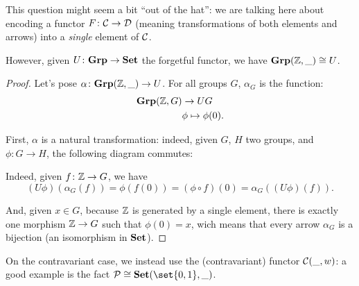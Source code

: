 \documentclass[a4paper]{article}
\theoremstyle { remark }
\theoremstyle { definition }
\theoremstyle { plain }
\begin{document}
This question might seem a bit \enquote{out of the hat}: we are talking here about encoding a functor \( F \colon  \mathcal { C }  \to  \mathcal { D }  \) (meaning transformations of both elements and arrows) into a \emph{single} element of \(  \mathcal { C }  \).

However, given \( U \colon  \mathbf { Grp }  \to  \mathbf { Set }  \) the forgetful functor, we have \(  \mathbf { Grp } ( \mathbb { Z } , \_) \cong U \).

\begin{proof}
Let's pose \( \alpha \colon  \mathbf { Grp } ( \mathbb { Z } , \_) \to U \).
For all groups \( G \), \( \alpha_G \) is the function:
\begin{align*}
   \mathbf { Grp } ( \mathbb { Z } , G) & \to U G \\
              & \phi \mapsto \phi(0).
\end{align*}

First, \( \alpha \) is a natural transformation: indeed, given \( G \), \( H \) two groups, and \( \phi \colon G \to H \), the following diagram commutes:

\begin{center}
\end{center}

Indeed, given \( f \colon  \mathbb { Z }  \to G \), we have
\[
  (U \phi) (\alpha_G(f))
  = \phi(f(0))
  = (\phi \circ f)(0)
  = \alpha_G((U\phi)(f)).
\]

And, given \( x \in G \), because \(  \mathbb { Z }  \) is generated by a single element, there is exactly one morphism \(  \mathbb { Z }  \to G \) such that \( \phi(0) = x \), wich means that every arrow \( \alpha_G \) is a bijection (an isomorphism in \(  \mathbf { Set }  \)).
\end{proof}

On the contravariant case, we instead use the (contravariant) functor \(  \mathcal { C } (\_, w) \): a good example is the fact \( \pset \cong \Set(\set{0,1}, \_) \).
\end{document}

